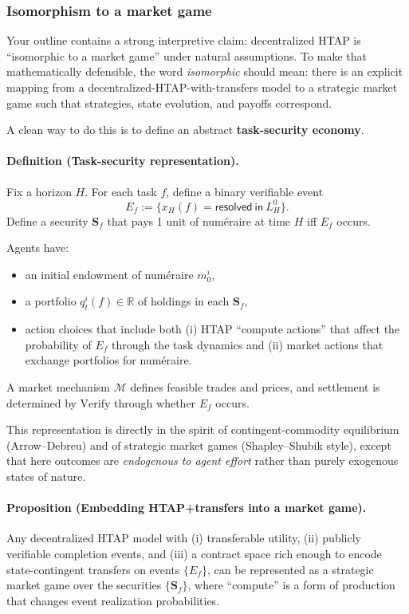 \subsubsection{Isomorphism to a market game}

Your outline contains a strong interpretive claim: decentralized HTAP is ``isomorphic to a market game'' under natural assumptions. To make that mathematically defensible, the word \emph{isomorphic} should mean: there is an explicit mapping from a decentralized-HTAP-with-transfers model to a strategic market game such that strategies, state evolution, and payoffs correspond.

A clean way to do this is to define an abstract \textbf{task-security economy}.

\paragraph{Definition (Task-security representation).}
Fix a horizon \(H\). For each task \(f\), define a binary verifiable event
\[
E_f := \{x_H(f)=\mathsf{resolved\ in\ } L_H^0\}.
\]
Define a security \(\mathbf{S}_f\) that pays 1 unit of num\'eraire at time \(H\) iff \(E_f\) occurs.

Agents have:
\begin{itemize}
\item an initial endowment of num\'eraire \(m_0^i\),
\item a portfolio \(q_t^i(f)\in\mathbb{R}\) of holdings in each \(\mathbf{S}_f\),
\item action choices that include both (i) HTAP ``compute actions'' that affect the probability of \(E_f\) through the task dynamics and (ii) market actions that exchange portfolios for num\'eraire.
\end{itemize}

A market mechanism \(\mathcal{M}\) defines feasible trades and prices, and settlement is determined by \(\mathrm{Verify}\) through whether \(E_f\) occurs.

This representation is directly in the spirit of contingent-commodity equilibrium (Arrow--Debreu) and of strategic market games (Shapley--Shubik style), except that here outcomes are \emph{endogenous to agent effort} rather than purely exogenous states of nature.

\paragraph{Proposition (Embedding HTAP+transfers into a market game).}
Any decentralized HTAP model with (i) transferable utility, (ii) publicly verifiable completion events, and (iii) a contract space rich enough to encode state-contingent transfers on events \(\{E_f\}\), can be represented as a strategic market game over the securities \(\{\mathbf{S}_f\}\), where ``compute'' is a form of production that changes event realization probabilities.

